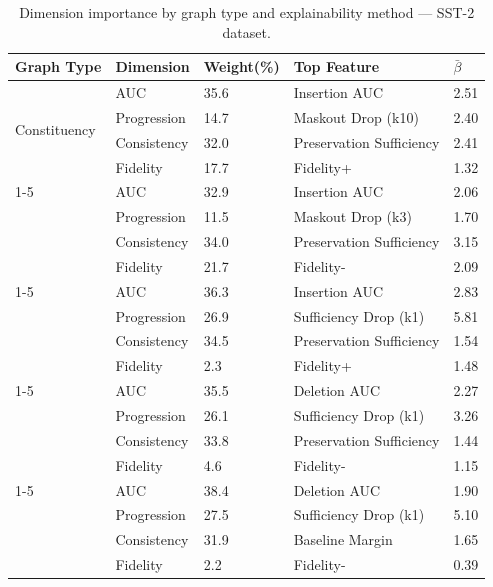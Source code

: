 \documentclass[review,12pt]{elsarticle}
\begin{document}
\begin{table}[!ht]
\centering
\renewcommand{\arraystretch}{1.1}
\tiny
\setlength{\tabcolsep}{5pt}
\caption{Dimension importance by graph type and explainability method --- SST-2 dataset.}
\label{tab:dimension_sst2}
\begin{tabular}{@{}m{2.3cm} m{2.2cm} m{1.2cm} m{4cm} m{0.8cm}@{}}
\toprule
\textbf{Graph Type} & \textbf{Dimension} & \textbf{Weight(\%)} & \textbf{Top Feature} & \textbf{$\bar{\beta}$} \\
\midrule
\multirow{4}{*}{Constituency}
& AUC & 35.6 & Insertion AUC & 2.51 \\
& Progression & 14.7 & Maskout Drop (k10) & 2.40 \\
& Consistency & 32.0 & Preservation Sufficiency & 2.41 \\
& Fidelity & 17.7 & Fidelity+ & 1.32 \\
\cmidrule{1-5}
\multirow{4}{*}{Syntactic}
& AUC & 32.9 & Insertion AUC & 2.06 \\
& Progression & 11.5 & Maskout Drop (k3) & 1.70 \\
& Consistency & 34.0 & Preservation Sufficiency & 3.15 \\
& Fidelity & 21.7 & Fidelity- & 2.09 \\
\cmidrule{1-5}
\multirow{4}{*}{Skipgrams}
& AUC & 36.3 & Insertion AUC & 2.83 \\
& Progression & 26.9 & Sufficiency Drop (k1) & 5.81 \\
& Consistency & 34.5 & Preservation Sufficiency & 1.54 \\
& Fidelity & 2.3 & Fidelity+ & 1.48 \\
\cmidrule{1-5}
\multirow{4}{*}{Window}
& AUC & 35.5 & Deletion AUC & 2.27 \\
& Progression & 26.1 & Sufficiency Drop (k1) & 3.26 \\
& Consistency & 33.8 & Preservation Sufficiency & 1.44 \\
& Fidelity & 4.6 & Fidelity- & 1.15 \\
\cmidrule{1-5}
\multirow{4}{*}{Tokens}
& AUC & 38.4 & Deletion AUC & 1.90 \\
& Progression & 27.5 & Sufficiency Drop (k1) & 5.10 \\
& Consistency & 31.9 & Baseline Margin & 1.65 \\
& Fidelity & 2.2 & Fidelity- & 0.39 \\
\bottomrule
\end{tabular}
\end{table}
\end{document}
